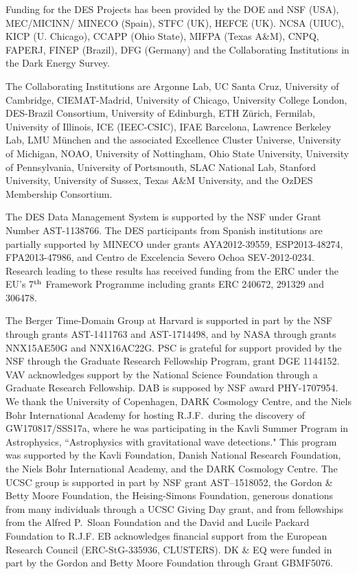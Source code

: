 Funding for the DES Projects has been provided by the DOE and NSF (USA),
MEC/MICINN/ MINECO (Spain), STFC (UK), HEFCE (UK). NCSA (UIUC),
KICP (U. Chicago), CCAPP (Ohio State), MIFPA (Texas A\&M), CNPQ, FAPERJ,
FINEP (Brazil), DFG (Germany) and the Collaborating Institutions in the Dark Energy Survey.

The Collaborating Institutions are Argonne Lab, UC Santa Cruz,
University of Cambridge, CIEMAT-Madrid, University of Chicago, University College London,
DES-Brazil Consortium, University of Edinburgh, ETH Z{\"u}rich, Fermilab,
University of Illinois, ICE (IEEC-CSIC), IFAE Barcelona, Lawrence Berkeley Lab,
LMU M{\"u}nchen and the associated Excellence Cluster Universe,
University of Michigan, NOAO, University of Nottingham, Ohio State University, University of
Pennsylvania, University of Portsmouth, SLAC National Lab, Stanford University,
University of Sussex, Texas A\&M University, and the OzDES Membership Consortium.

The DES Data Management System is supported by the NSF under
Grant Number AST-1138766. The DES participants from Spanish institutions are partially
supported by MINECO under grants AYA2012-39559, ESP2013-48274, FPA2013-47986,
and Centro de Excelencia Severo Ochoa SEV-2012-0234. Research leading
to these results has received funding from the ERC under the EU's 7$^{\rm th}$
Framework Programme including grants ERC 240672, 291329 and 306478.

The Berger Time-Domain Group at Harvard is supported in part by the NSF through grants AST-1411763 and AST-1714498, and by NASA through grants NNX15AE50G and NNX16AC22G. PSC is grateful for support provided by the NSF through the Graduate Research Fellowship Program, grant DGE 1144152. VAV acknowledges support by the National Science Foundation through a Graduate Research Fellowship. DAB is supposed by NSF award PHY-1707954. We thank the University of Copenhagen, DARK Cosmology Centre, and the Niels Bohr International Academy for hosting R.J.F.\ during the discovery of GW170817/SSS17a, where he was participating in the Kavli Summer Program in Astrophysics, ``Astrophysics with gravitational wave detections."  This program was supported by the Kavli Foundation, Danish National Research Foundation, the Niels Bohr International Academy, and the DARK Cosmology Centre. The UCSC group is supported in part by NSF grant AST--1518052, the Gordon \& Betty Moore Foundation, the Heising-Simons Foundation, generous donations from many individuals through a UCSC Giving Day grant, and from fellowships from the Alfred P.\ Sloan Foundation and the David and Lucile Packard Foundation to R.J.F. EB acknowledges financial support from the European Research Council (ERC-StG-335936, CLUSTERS). DK \& EQ were funded in part by the Gordon and Betty Moore Foundation through Grant GBMF5076.

